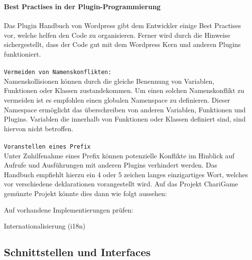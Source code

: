\textbf{Best Practises in der Plugin-Programmierung}\\\\
Das Plugin Handbuch von Wordpress gibt dem Entwickler einige Best Practises vor, welche helfen den Code zu organisieren.
Ferner wird durch die Hinweise sichergestellt, dass der Code gut mit dem Wordpress Kern und anderen Plugins funktioniert.
\\
\\
\texttt{Vermeiden von Namenskonflikten:}\\
Namenskollisionen können durch die gleiche Benennung von Variablen, Funktionen oder Klassen zustandekommen.
Um einen solchen Namenskonflikt zu vermeiden ist es empfohlen einen globalen Namenspace zu definieren. Dieser Namespace ermöglicht das überschreiben von anderen Variablen, Funktionen und Plugins.
Variablen die innerhalb von Funktionen oder Klassen definiert sind, sind hiervon nicht betroffen.
\\
\\
\texttt{Voranstellen eines Prefix}\\
Unter Zuhilfenahme eines Prefix können potenzielle Konflikte im Hinblick auf Aufrufe und Ausführungen mit anderen Plugins verhindert werden.
Das Handbuch empfiehlt hierzu ein 4 oder 5 zeichen langes einzigartiges Wort, welches vor verschiedene deklarationen vorangestellt wird.
Auf das Projekt ChariGame gemünzte Projekt könnte dies dann wie folgt aussehen:

Auf vorhandene Implementierungen prüfen:






Internationalisierung (i18n)

\subsection{Schnittstellen und Interfaces}

